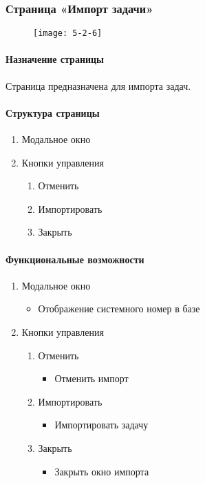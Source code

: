 \subsubsection{Страница «Импорт задачи»}
\begin{figure}[H]
	\texttt{[image: 5-2-6]}
\end{figure}
\paragraph{Назначение страницы}
Страница предназначена для импорта задач.

\paragraph{Структура страницы}
\begin{enumerate}
	\item Модальное окно
	\item Кнопки управления
	\begin{enumerate}
		\item Отменить
		\item Импортировать
		\item Закрыть
	\end{enumerate}
\end{enumerate}

\paragraph{Функциональные возможности}
\begin{enumerate}
	\item Модальное окно
	\begin{itemize}
		\item Отображение системного номер в базе
	\end{itemize}
	\item Кнопки управления
	\begin{enumerate}
		\item Отменить
		\begin{itemize}
			\item Отменить импорт
		\end{itemize}

		\item Импортировать
		\begin{itemize}
			\item Импортировать задачу
		\end{itemize}

		\item Закрыть
		\begin{itemize}
			\item Закрыть окно импорта
		\end{itemize}
	\end{enumerate}
\end{enumerate}


